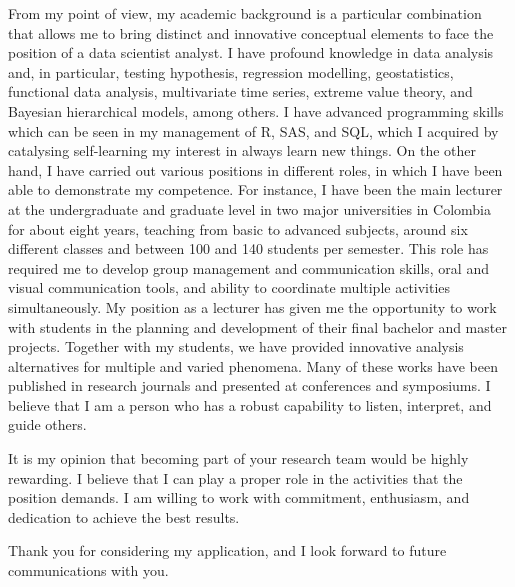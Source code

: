 \documentclass[11pt, a4paper]{awesome-cv}
\begin{document}
\begin{cvletter}
From my point of view, my academic background is a particular combination that allows me to bring distinct and innovative conceptual elements to face the position of a data scientist analyst. I have profound knowledge in data analysis and, in particular, testing hypothesis, regression modelling, geostatistics, functional data analysis, multivariate time series, extreme value theory, and  Bayesian hierarchical models, among others. I have advanced programming skills which can be seen in my management of R, SAS, and SQL, which I acquired by catalysing self-learning my interest in always learn new things. On the other hand, I have carried out various positions in different roles, in which I have been able to demonstrate my competence. For instance, I have been the main lecturer at the undergraduate and graduate level in two major universities in Colombia for about eight years, teaching from basic to advanced subjects, around six different classes and between 100 and 140 students per semester. This role has required me to develop group management and communication skills, oral and visual communication tools, and ability to coordinate multiple activities simultaneously. My position as a lecturer has given me the opportunity to work with students in the planning and development of their final bachelor and master projects. Together with my students, we have provided innovative analysis alternatives for multiple and varied phenomena. Many of these works have been published in research journals and presented at conferences and symposiums. I believe that I am a person who has a robust capability to listen, interpret, and guide others. \par
It is my opinion that becoming part of your research team would be highly rewarding. I believe that I can play a proper role in the activities that the position demands. I am willing to work with commitment, enthusiasm, and dedication to achieve the best results.\par
Thank you for considering my application, and I look forward to future communications with you.\par
\end{cvletter}
\makeletterclosing
\end{document}
